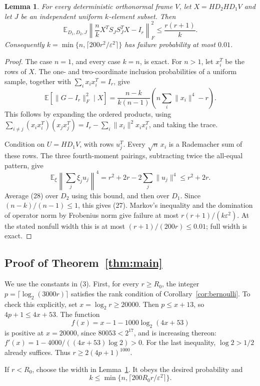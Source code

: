 \documentclass[11pt]{article}
\newtheorem{lemma}[theorem]{Lemma}
\theoremstyle{definition}
\newcommand{\E}{\mathbb E}
\begin{document}
\begin{lemma}\label{lem:small}
For every deterministic orthonormal frame \(V\), let \(X=HD_2HD_1V\)
and let \(J\) be an independent uniform \(k\)-element subset. Then
\[
 \E_{D_1,D_2,J}\left\|\frac nkX^TS_JS_J^TX-I_r\right\|_F^2
                                      \le\frac{r(r+1)}k.         \tag{27}
\]
Consequently \(k=\min\{n,\lceil200r^2/\varepsilon^2\rceil\}\)
has failure probability at most \(0.01\).
\end{lemma}
\begin{proof}
The case \(n=1\), and every case \(k=n\), is exact.
For \(n>1\), let \(x_i^T\) be the rows of \(X\).
The one- and two-coordinate inclusion probabilities of a uniform
sample, together with \(\sum_i x_ix_i^T=I_r\), give
\[
 \E\!\left[\|G-I_r\|_F^2\mid X\right]
  =\frac{n-k}{k(n-1)}
                \left(n\sum_i\|x_i\|^4-r\right).                \tag{28}
\]
This follows by expanding the ordered products, using
\(\sum_{i\ne j}(x_ix_i^T)(x_jx_j^T)
=I_r-\sum_i\|x_i\|^2x_ix_i^T\), and taking the trace.

Condition on \(U=HD_1V\), with rows \(u_j^T\).
Every \(\sqrt n\,x_i\) is a Rademacher sum of these rows.
The three fourth-moment pairings, subtracting twice the all-equal
pattern, give
\[
 \E_{\xi}\left\|\sum_j\xi_j u_j\right\|^4
             =r^2+2r-2\sum_j\|u_j\|^4\le r^2+2r.
\]
Average (28) over \(D_2\) using this bound, and then over \(D_1\).
Since \((n-k)/(n-1)\le1\), this gives (27).
Markov's inequality and the domination of operator norm by
Frobenius norm give failure at most
\(r(r+1)/(k\varepsilon^2)\).
At the stated nonfull width this is at most
\((r+1)/(200r)\le0.01\); full width is exact.
\end{proof}

\subsection{Proof of Theorem~\ref{thm:main}}

We use the constants in (3). First, for every \(r\ge R_0\), the
integer \(p=\lceil\log_2(3000r)\rceil\) satisfies the rank condition
of Corollary~\ref{cor:bernoulli}. To check this explicitly, set
\(x=\log_2r\ge20000\). Then \(p\le x+13\), so \(4p+1\le4x+53\).
The function
\[
 f(x)=x-1-1000\log_2(4x+53)
\]
is positive at \(x=20000\), since \(80053<2^{17}\), and is
increasing thereon:
\(f'(x)=1-4000/((4x+53)\log 2)>0\).
For the last inequality, \(\log2>1/2\) already suffices.
Thus \(r\ge2(4p+1)^{1000}\).

If \(r<R_0\), choose the width in Lemma~\ref{lem:small}.
It obeys the desired probability and
\[
 k\le\min\{n,\lceil200R_0r/\varepsilon^2\rceil\}.
\]
\end{document}
